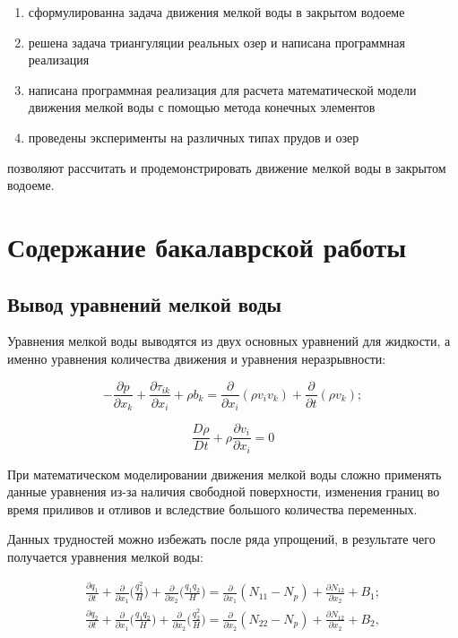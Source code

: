 \documentclass[14pt]{extreport}
\begin{document}
\begin{enumerate}
\item сформулированна задача движения мелкой воды в закрытом водоеме
\item решена задача триангуляции реальных озер и написана программная реализация
\item написана программная реализация для расчета математической модели движения мелкой воды с помощью метода конечных элементов
\item проведены эксперименты на различных типах прудов и озер
\end{enumerate}




 позволяют рассчитать и продемонстрировать движение мелкой воды в закрытом водоеме.


\chapter{Содержание бакалаврской работы}


\section{Вывод уравнений мелкой воды}

Уравнения мелкой воды выводятся из двух основных уравнений для жидкости, а именно уравнения количества движения и уравнения неразрывности:

\begin{equation}\label{eq:shallow_water:1}
-\frac{\partial p}{\partial x_k} + \frac{\partial \tau_{ik}}{\partial x_i} + \rho b_k = \frac{\partial}{\partial x_i}(\rho v_i v_k) + \frac{\partial}{\partial t}(\rho v_k);
\end{equation}

\begin{equation}\label{eq:shallow_water:2}
\frac{D\rho}{Dt}+\rho \frac{\partial v_i}{\partial x_i} =0
\end{equation}

При математическом моделировании движения мелкой воды сложно применять данные уравнения из-за наличия свободной поверхности, изменения границ во время приливов и отливов и вследствие большого количества переменных.

Данных трудностей можно избежать после ряда упрощений, в результате чего получается уравнения мелкой воды:

\begin{equation}\label{eq:shallow_water:22}
\begin{aligned}
\frac{\partial q_1}{\partial t} + \frac{\partial}{\partial x_1} \bigg(\frac{q_1^2}{H}\bigg)+\frac{\partial }{\partial x_2}\bigg(\frac{q_1 q_2}{H}\bigg) = \frac{\partial}{\partial x_1} (N_{11}-N_p) + \frac{\partial N_{12}}{\partial x_2} + B_1; \\
\frac{\partial q_2}{\partial t} + \frac{\partial}{\partial x_1} \bigg(\frac{q_1 q_2}{H}\bigg)+\frac{\partial }{\partial x_2}\bigg(\frac{q_2^2}{H}\bigg) = \frac{\partial}{\partial x_2} (N_{22}-N_p) + \frac{\partial N_{12}}{\partial x_2} + B_2,
\end{aligned}
\end{equation}
\end{document}
